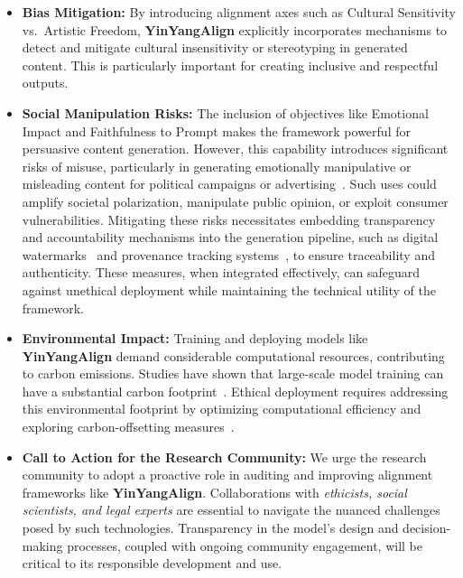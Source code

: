 \begin{itemize}
    \item \textbf{Bias Mitigation:} By introducing alignment axes such as Cultural Sensitivity vs.\ Artistic Freedom, \textbf{YinYangAlign} explicitly incorporates mechanisms to detect and mitigate cultural insensitivity or stereotyping in generated content. This is particularly important for creating inclusive and respectful outputs.
    \item \textbf{Social Manipulation Risks:} The inclusion of objectives like Emotional Impact and Faithfulness to Prompt makes the framework powerful for persuasive content generation. However, this capability introduces significant risks of misuse, particularly in generating emotionally manipulative or misleading content for political campaigns or advertising~\cite{hwang2020deepfake, zihao2022disinformation}. Such uses could amplify societal polarization, manipulate public opinion, or exploit consumer vulnerabilities. Mitigating these risks necessitates embedding transparency and accountability mechanisms into the generation pipeline, such as digital watermarks~\cite{ferreira2021watermarking} and provenance tracking systems~\cite{agarwal2019blockchain}, to ensure traceability and authenticity. These measures, when integrated effectively, can safeguard against unethical deployment while maintaining the technical utility of the framework.
    \item \textbf{Environmental Impact:} Training and deploying models like \textbf{YinYangAlign} demand considerable computational resources, contributing to carbon emissions. Studies have shown that large-scale model training can have a substantial carbon footprint~\cite{strubell2019energy, patterson2021carbon}. Ethical deployment requires addressing this environmental footprint by optimizing computational efficiency and exploring carbon-offsetting measures~\cite{anthony2020carbontracker}. 
    \item \textbf{Call to Action for the Research Community:} We urge the research community to adopt a proactive role in auditing and improving alignment frameworks like \textbf{YinYangAlign}. Collaborations with \emph{ethicists, social scientists, and legal experts} are essential to navigate the nuanced challenges posed by such technologies. Transparency in the model's design and decision-making processes, coupled with ongoing community engagement, will be critical to its responsible development and use.
\end{itemize}
